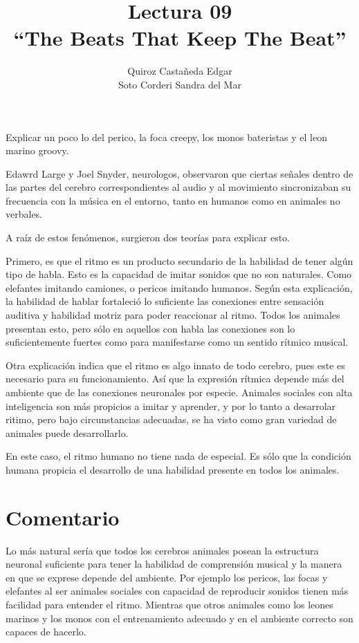 \documentclass[12pt]{article}
\title{
	Lectura 09\\ 
	``The Beats That Keep The Beat''
	}
\author{
	Quiroz Castañeda Edgar \\
	Soto Corderi Sandra del Mar
	}
\makeatletter
\renewcommand{\maketitle}{
	\bgroup\setlength{\parindent}{0pt}

	\begin{flushright}
		\@author
	\end{flushright}

	\begin{flushleft}
		\textbf{\@title}
	\end{flushleft}

	\egroup
}
\makeatother
\begin{document}
	\maketitle
	
	
	Explicar un poco lo del perico, la foca creepy, los monos bateristas y el 
	leon marino groovy.

	Edawrd Large y Joel Snyder, neurologos, observaron que ciertas señales 
	dentro de las partes del cerebro correspondientes al audio y al movimiento
	sincronizaban su frecuencia con la música en el entorno, tanto en humanos 
	como en animales no verbales.

	A raíz de estos fenómenos, surgieron dos teorías para explicar esto.

	Primero, es que el ritmo es un producto secundario de la habilidad de 
	tener algún tipo de habla. Esto es la capacidad de imitar sonidos que no son
	naturales. Como elefantes imitando camiones, o pericos imitando humanos.
	Según esta explicación, la habilidad de hablar fortaleció lo suficiente las 
	conexiones entre sensación auditiva y habilidad motriz para poder reaccionar 
	al ritmo. Todos los animales presentan esto, pero sólo en aquellos con habla
	las conexiones son lo suficientemente fuertes como para manifestarse como 
	un sentido rítmico musical.

	Otra explicación indica que el ritmo es algo innato de todo cerebro, pues 
	este es necesario para su funcionamiento. Así que la expresión rítmica 
	depende más del ambiente que de las conexiones neuronales por especie.
	Animales sociales con alta inteligencia son más propicios a imitar y
	aprender, y por lo tanto a desarrolar ritimo, pero bajo circunstancias 
	adecuadas, se ha visto como gran variedad de animales puede desarrollarlo.

	En este caso, el ritmo humano no tiene nada de especial. Es sólo que la 
	condición humana propicia el desarrollo de una habilidad presente en todos 
	los animales.
	
	\section*{Comentario}
	Lo más natural sería que todos los cerebros animales posean la estructura 
	neuronal suficiente para tener la habilidad de comprensión musical y la 
	manera en que se exprese depende del ambiente. Por ejemplo los pericos, las 
	focas y elefantes al ser animales sociales con capacidad de reproducir 
	sonidos tienen más facilidad para entender el ritmo. Mientras que otros 
	animales como los leones marinos y los monos con el entrenamiento adecuado 
	y en el ambiente correcto son capaces de hacerlo.
	
\end{document}
